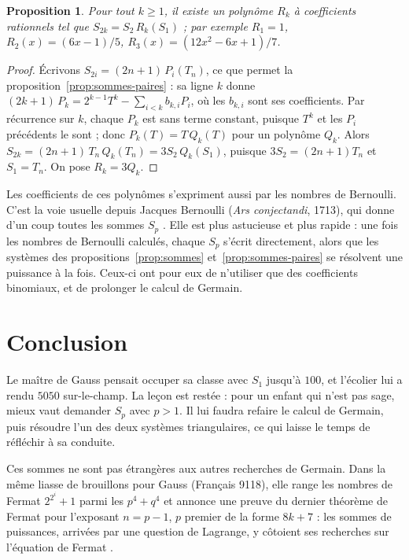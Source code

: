 \documentclass[11pt,a4paper]{article}
\newtheorem{proposition}{Proposition}
\theoremstyle{remark}
\begin{document}
\begin{proposition}\label{prop:s2}
Pour tout $k \geq 1$, il existe un polynôme $R_k$ à coefficients rationnels
tel que $S_{2k} = S_2 \, R_k(S_1)$ ; par exemple $R_1 = 1$,
$R_2(x) = (6x - 1)/5$, $R_3(x) = (12x^2 - 6x + 1)/7$.
\end{proposition}

\begin{proof}
Écrivons $S_{2i} = (2n+1)\,P_i(T_n)$, ce que permet la
proposition~\ref{prop:sommes-paires} : sa ligne $k$ donne
$(2k+1)\,P_k = 2^{k-1}T^k - \sum_{i<k} b_{k,i} P_i$, où les $b_{k,i}$ sont
ses coefficients. Par récurrence sur $k$, chaque $P_k$ est sans terme
constant, puisque $T^k$ et les $P_i$ précédents le sont ; donc
$P_k(T) = T\,Q_k(T)$ pour un polynôme $Q_k$. Alors
$S_{2k} = (2n+1)\,T_n\,Q_k(T_n) = 3S_2\,Q_k(S_1)$, puisque
$3S_2 = (2n+1)T_n$ et $S_1 = T_n$. On pose $R_k = 3Q_k$.
\end{proof}

Les coefficients de ces polynômes s'expriment aussi par les nombres de
Bernoulli. C'est la voie usuelle depuis Jacques Bernoulli (\emph{Ars
conjectandi}, 1713), qui donne d'un coup toutes les sommes $S_p$
\cite{knuth,edwards}. Elle est plus astucieuse et plus rapide : une fois les
nombres de Bernoulli calculés, chaque $S_p$ s'écrit directement, alors que
les systèmes des propositions~\ref{prop:sommes} et~\ref{prop:sommes-paires}
se résolvent une puissance à la fois. Ceux-ci ont pour eux de n'utiliser que
des coefficients binomiaux, et de prolonger le calcul de Germain.

\section*{Conclusion}

Le maître de Gauss pensait occuper sa classe avec $S_1$ jusqu'à $100$, et
l'écolier lui a rendu $5050$ sur-le-champ. La leçon est restée : pour un
enfant qui n'est pas sage, mieux vaut demander $S_p$ avec $p > 1$. Il lui
faudra refaire le calcul de Germain, puis résoudre l'un des deux systèmes
triangulaires, ce qui laisse le temps de réfléchir à sa conduite.

Ces sommes ne sont pas étrangères aux autres recherches de Germain. Dans la
même liasse de brouillons pour Gauss (Français 9118), elle range les nombres
de Fermat $2^{2^i}+1$ parmi les $p^4 + q^4$ \cite[vue~93]{fr9118} et annonce
une preuve du dernier théorème de Fermat pour l'exposant $n = p - 1$, $p$
premier de la forme $8k+7$ \cite[vue~44]{fr9118} : les sommes de puissances,
arrivées par une question de Lagrange, y côtoient ses recherches sur
l'équation de Fermat \cite{laubenbacher-pengelley}.
\end{document}
